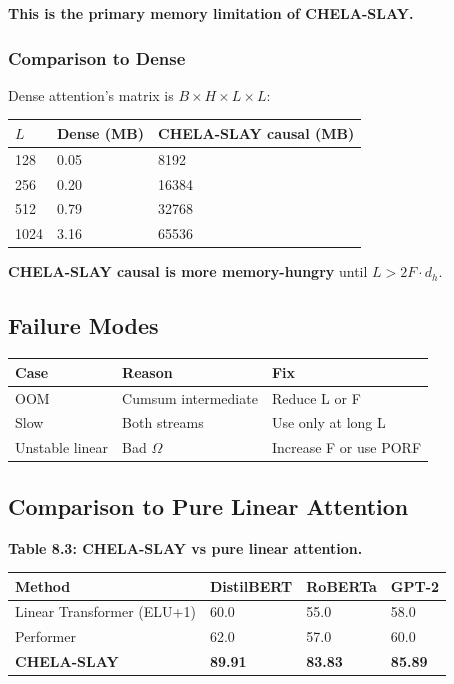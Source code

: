 \textbf{This is the primary memory limitation of CHELA-SLAY.}

\subsubsection{Comparison to Dense}

Dense attention's matrix is $B \times H \times L \times L$:

\begin{table}[H]
\centering
\small
\begin{tabular}{lll}
\toprule
\textbf{$L$} & \textbf{Dense (MB)} & \textbf{CHELA-SLAY causal (MB)} \\
\midrule
128 & 0.05 & 8192 \\
256 & 0.20 & 16384 \\
512 & 0.79 & 32768 \\
1024 & 3.16 & 65536 \\
\bottomrule
\end{tabular}
\end{table}

\textbf{CHELA-SLAY causal is more memory-hungry} until $L > 2F \cdot d_h$.

\subsection{Failure Modes}

\begin{table}[H]
\centering
\small
\begin{tabular}{lll}
\toprule
\textbf{Case} & \textbf{Reason} & \textbf{Fix} \\
\midrule
OOM & Cumsum intermediate & Reduce L or F \\
Slow & Both streams & Use only at long L \\
Unstable linear & Bad $\Omega$ & Increase F or use PORF \\
\bottomrule
\end{tabular}
\end{table}

\subsection{Comparison to Pure Linear Attention}

\textbf{Table 8.3: CHELA-SLAY vs pure linear attention.}

\begin{table}[H]
\centering
\small
\begin{tabular}{llll}
\toprule
\textbf{Method} & \textbf{DistilBERT} & \textbf{RoBERTa} & \textbf{GPT-2} \\
\midrule
Linear Transformer (ELU+1) & 60.0 & 55.0 & 58.0 \\
Performer & 62.0 & 57.0 & 60.0 \\
\textbf{CHELA-SLAY} & \textbf{89.91} & \textbf{83.83} & \textbf{85.89} \\
\bottomrule
\end{tabular}
\end{table}

